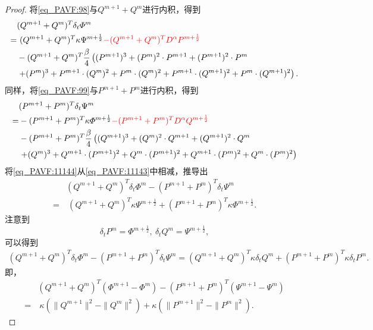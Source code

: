 \begin{proof}
将\eqref{eq_PAVF:98}与$Q^{m+1}+Q^{m}$进行内积，得到
\begin{align}
&(Q^{m+1}+Q^{m})^{T}\delta_{t} \varPhi^{m}\nonumber\\
=&~(Q^{m+1}+Q^{m})^{T}\kappa \Psi^{m+\frac{1}{2}}\textcolor[rgb]{1.00,0.00,0.00}{-(Q^{m+1}+Q^{m})^{T}D^{\alpha} P^{m+\frac{1}{2}}}\nonumber\\
&-(Q^{m+1}+Q^{m})^{T}\frac{\beta}{4}\left((P^{m+1})^3+(P^{m})^{2}\cdot P^{m+1}+(P^{m+1})^{2}\cdot P^{m}\right.\nonumber\\
&\left.+(P^{m})^{3}+P^{m+1}\cdot (Q^{m})^{2}+P^{m}\cdot (Q^{m})^{2}+P^{m+1}\cdot (Q^{m+1})^{2}+P^{m}\cdot (Q^{m+1})^{2}\right).\label{eq_PAVF:11143}
\end{align}
同样，将\eqref{eq_PAVF:99}与$P^{m+1}+P^{m}$进行内积，得到
\begin{align}
&(P^{m+1}+P^{m})^{T}\delta_{t} \Psi^{m}\nonumber\\
=&-(P^{m+1}+P^{m})^{T}\kappa \varPhi^{m+\frac{1}{2}}\textcolor[rgb]{1.00,0.00,0.00}{-(P^{m+1}+P^{m})^{T}D^{\alpha} Q^{m+\frac{1}{2}}}\nonumber\\
&-(P^{m+1}+P^{m})^{T}\frac{\beta}{4}\left((Q^{m+1})^3+(Q^{m})^{2}\cdot Q^{m+1}+(Q^{m+1})^{2}\cdot Q^{m}\right.\nonumber\\
&\left.+(Q^{m})^{3}+Q^{m+1}\cdot (P^{m+1})^{2}+Q^{m}\cdot (P^{m+1})^{2}+Q^{m+1}\cdot (P^{m})^{2}+Q^{m}\cdot (P^{m})^{2}\right)\label{eq_PAVF:11144}
\end{align}
将\eqref{eq_PAVF:11144}从\eqref{eq_PAVF:11143}中相减，推导出
\begin{align}
&(Q^{m+1}+Q^{m})^{T}\delta_{t} \varPhi^{m}-(P^{m+1}+P^{m})^{T}\delta_{t} \Psi^{m}\nonumber\\
=&~(Q^{m+1}+Q^{m})^{T}\kappa \Psi^{m+\frac{1}{2}}+(P^{m+1}+P^{m})^{T}\kappa \varPhi^{m+\frac{1}{2}}.\label{eq_PAVF:11145}
\end{align}
注意到
$$\delta_t P^m=\varPhi^{m+\frac{1}{2}},~\delta_t Q^m=\Psi^{m+\frac{1}{2}},$$
可以得到
\begin{align}\label{eq_PAVF:11146}
(Q^{m+1}+Q^{m})^{T}\delta_{t} \varPhi^{m}\!-\!(P^{m+1}+P^{m})^{T}\delta_{t} \Psi^{m}=(Q^{m+1}+Q^{m})^{T}\kappa \delta_t Q^m+(P^{m+1}+P^{m})^{T}\kappa \delta_t P^m.
\end{align}
即，
\begin{align}
&(Q^{m+1}+Q^{m})^{T}(\varPhi^{m+1}-\varPhi^{m})-(P^{m+1}+P^{m})^{T}(\Psi^{m+1}-\Psi^{m})\nonumber\\
=&~\kappa (\|Q^{m+1}\|^2-\|Q^{m}\|^2)+\kappa (\|P^{m+1}\|^2-\|P^{m}\|^2).\label{eq_PAVF:11147}

\end{align}
\end{proof}
